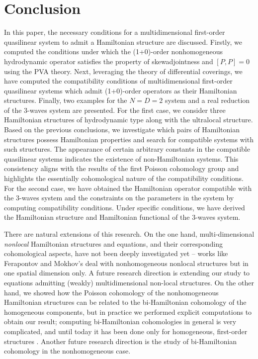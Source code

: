 \documentclass[10pt,a4paper]{amsart}
\numberwithin{equation}{section}
\begin{document}
\section{Conclusion}
In this paper, the necessary conditions for a multidimensional first-order quasilinear system to admit a Hamiltonian structure are discussed. Firstly, we computed the conditions under which the (1+0)-order nonhomogeneous hydrodynamic operator satisfies the property of skewadjointness and $[P,P]=0$ using the PVA theory. Next, leveraging the theory of differential coverings, we have computed the compatibility conditions of multidimensional first-order quasilinear systems which admit (1+0)-order operators as their Hamiltonian structures. Finally, two examples for the $N=D=2$ system and a real reduction of the 3-waves system are presented. For the first case, we consider three Hamiltonian structures of hydrodynamic type along with the ultralocal structure. Based on the previous conclusions, we investigate which pairs of Hamiltonian structures possess Hamiltonian properties and search for compatible systems with such structures. The appearance of certain arbitrary constants in the compatible quasilinear systems indicates the existence of non-Hamiltonian systems. This consistency aligns with the results of the first Poisson cohomology group and highlights the essentially cohomological nature of the compatibility conditions. For the second case, we have obtained the Hamiltonian operator compatible with the 3-waves system and the constraints on the parameters in the system by computing compatibility conditions. Under specific conditions, we have derived the Hamiltonian structure and Hamiltonian functional of the 3-waves system.

There are natural extensions of this research. On the one hand, multi-dimensional \emph{nonlocal} Hamiltonian structures and equations, and their corresponding cohomological aspects, have not been deeply investigated yet -- works like Ferapontov and Mokhov's \cite{mokhov1994hamiltonian} deal with nonhomogeneous nonlocal structures but in one spatial dimension only. A future research direction is extending our study to equations admitting (weakly) multidimensional non-local structures. On the other hand, we showed how the Poisson cohomology of the nonhomogeneous Hamiltonian structures can be related to the bi-Hamiltonian cohomology of the homogeneous components, but in practice we performed explicit computations to obtain our result; computing bi-Hamiltonian cohomologies in general is very complicated, and until today it has been done only for homogeneous, first-order structures \cite{cps16,lz05}. Another future research direction is the study of bi-Hamiltonian cohomology in the nonhomogeneous case.
\end{document}
